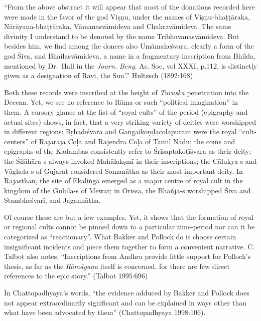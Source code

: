 \begin{myquote}
“From the above abstract it will appear that most of the donations recorded here were made in the favor of the god Viṣṇu, under the names of Viṣṇu-bhaṭṭāraka, Nārāyaṇa-bhaṭṭāraka, Vāmanasvāmideva and Chakravāmideva. The same divinity I understand to be denoted by the name Tribhuvanasvāmideva. But besides him, we find among the donees also Umāmaheśvara, clearly a form of the god Śiva, and Bhailasvāmideva, a name in a fragmentary inscription from Bhilda, mentioned by Dr.~Hall in the {\sl Journ. Beng}. As. Soc, vol XXXI, p.112, is distinctly given as a designation of Ravi, the Sun’.”
\hfill Hultzsch  (1892:168)
\end{myquote}

Both these records were inscribed at the height of {\sl Turuṣka} penetration into the Deccan. Yet, we see no reference to Rāma or such “political imagination” in them. A cursory glance at the list of “royal cults” of the period (epigraphy and actual sites) shows, in fact, that a very striking variety of deities were worshipped in different regions: Bṛhadīśvara and Gaṅgaikoṇḍacolapuram were the royal “cult-centers” of Rājarāja Coḷa and Rājendra Coḷa of Tamil Nadu; the coins and epigraphs of the Kadambas consistently refer to Śrīsaptakoṭīśvara as their deity; the Śilāhāra-s always invoked Mahālakṣmī in their inscriptions; the Cālukya-s and Vāghela-s of Gujarat considered Somanātha as their most important deity. In Rajasthan, the site of Ekaliṅga emerged as a major centre of royal cult in the kingdom of the Guhila-s of Mewar; in Orissa, the Bhañja-s worshipped Śiva and Stambheśvarī, and Jagannātha.

Of course these are but a few examples. Yet, it shows that the formation of royal or regional cults cannot be pinned down to a particular time-period nor can it be categorized as “reactionary”.  What Bakker and Pollock do is choose certain insignificant incidents and piece them together to form a convenient narrative. C. Talbot also notes, “Inscriptions from Andhra provide little support for Pollock’s thesis, as far as the {\sl Rāmāyaṇa} itself is concerned, for there are few direct references to the epic story.” (Talbot 1995:696) 

In Chattopadhyaya’s words, “the evidence adduced by Bakker and Pollock does not appear extraordinarily significant and can be explained in ways other than what have been advocated by them” (Chattopadhyaya 1998:106).

